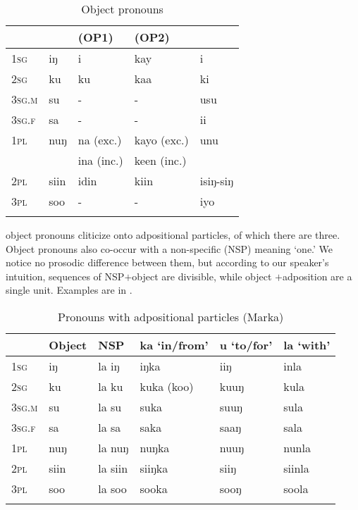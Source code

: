 \documentclass[output=paper,modfonts,nonflat,
colorlinks, citecolor=brown,
draftmode
]{langsci/langscibook}
\begin{document}
 \begin{table}
 	\caption{{Object pronouns}}
 	\label{tab:1:Object pronouns}
 	\begin{tabularx}{\textwidth}{Xllll} 
 		\lsptoprule
 		& \ilit{Marka}  & \ilit{Somali} (OP1) & \ilit{Somali} (OP2) & \ilit{Maay}   \\ 
 		\midrule
 		1\textsc{sg} & iŋ & i & kay & i \\
 		2\textsc{sg} & ku  & ku & kaa  & ki  \\
 		3\textsc{sg.m} & su & - & - & usu \\
 		3\textsc{sg.f} & sa & - & - & ii \\
 		1\textsc{pl} & nuŋ & na (exc.) & kayo (exc.) & unu \\
 		& & ina (inc.) & keen (inc.) &  \\
 		2\textsc{pl} & siin & idin & kiin & isiŋ-siŋ  \\
 		3\textsc{pl} & soo & - & - & iyo \\
 		\lspbottomrule
 	\end{tabularx}
 \end{table}
 
  object pronouns cliticize onto adpositional particles, of which there are three. Object pronouns also co-occur with a non-specific  (NSP) meaning `one.' We notice no prosodic difference between them, but according to our speaker's intuition, sequences of NSP$+$object  are divisible, while object $+$adposition are a single unit. Examples are in .\\
  
\begin{table}
 	\caption{{Pronouns with adpositional particles (Marka)}}
 	\label{tab:1:Pronouns Adpositions}
 	\begin{tabularx}{\textwidth}{Xlllll} 
 		\lsptoprule
 		& Object \isi{pronoun} & NSP  & ka `in/from' & u `to/for' & la `with' \\ 
 		\midrule
 		1\textsc{sg} & iŋ & la iŋ & iŋka & iiŋ & inla \\
 		2\textsc{sg} & ku  & la ku & kuka (koo)  & kuuŋ & kula  \\
 		3\textsc{sg.m} & su & la su & suka & suuŋ & sula \\
 		3\textsc{sg.f} & sa & la sa & saka & saaŋ & sala \\
 		1\textsc{pl} & nuŋ & la nuŋ & nuŋka & nuuŋ & nunla \\
 		2\textsc{pl} & siin & la siin & siiŋka & siiŋ & siinla  \\
 		3\textsc{pl} & soo & la soo & sooka & sooŋ & soola \\
 		\lspbottomrule
 	\end{tabularx}
 \end{table}
 
\end{document}
